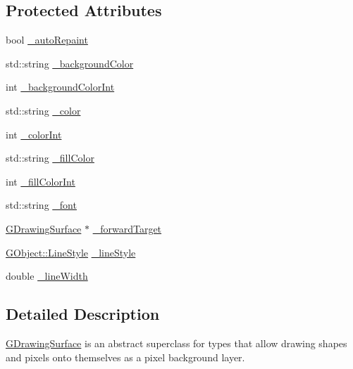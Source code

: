 \subsection*{Protected Attributes}
\begin{DoxyCompactItemize}
\item 
bool \mbox{\hyperlink{classsgl_1_1GDrawingSurface_a738dd6afc69ac536ad46cf4d89a90933}{\+\_\+auto\+Repaint}}
\item 
std\+::string \mbox{\hyperlink{classsgl_1_1GDrawingSurface_ad233544ea51cf6b435a199f3e3790607}{\+\_\+background\+Color}}
\item 
int \mbox{\hyperlink{classsgl_1_1GDrawingSurface_abb8452ab4f23ecf455b9e021bf09ef91}{\+\_\+background\+Color\+Int}}
\item 
std\+::string \mbox{\hyperlink{classsgl_1_1GDrawingSurface_a1134e770ae4315ea8bc1201e2f21da8b}{\+\_\+color}}
\item 
int \mbox{\hyperlink{classsgl_1_1GDrawingSurface_a003fdd343d9b7505c53a8b7a134200ed}{\+\_\+color\+Int}}
\item 
std\+::string \mbox{\hyperlink{classsgl_1_1GDrawingSurface_a179f8d6cee65cd8a54692e32b224392a}{\+\_\+fill\+Color}}
\item 
int \mbox{\hyperlink{classsgl_1_1GDrawingSurface_a751def333a67d651e5b99cc331ecb496}{\+\_\+fill\+Color\+Int}}
\item 
std\+::string \mbox{\hyperlink{classsgl_1_1GDrawingSurface_aea76ea1a8b5dd7b0a78653277e63b536}{\+\_\+font}}
\item 
\mbox{\hyperlink{classsgl_1_1GDrawingSurface}{G\+Drawing\+Surface}} $\ast$ \mbox{\hyperlink{classsgl_1_1GDrawingSurface_acbb02fa2a4a51a450fd1cc64dfc39ddd}{\+\_\+forward\+Target}}
\item 
\mbox{\hyperlink{classsgl_1_1GObject_a86e0f5648542856159bb40775c854aa7}{G\+Object\+::\+Line\+Style}} \mbox{\hyperlink{classsgl_1_1GDrawingSurface_ae15d02c66691247a6824dc5943a620e2}{\+\_\+line\+Style}}
\item 
double \mbox{\hyperlink{classsgl_1_1GDrawingSurface_a16e9033665937f13de2e163dc2184aff}{\+\_\+line\+Width}}
\end{DoxyCompactItemize}


\subsection{Detailed Description}
\mbox{\hyperlink{classsgl_1_1GDrawingSurface}{G\+Drawing\+Surface}} is an abstract superclass for types that allow drawing shapes and pixels onto themselves as a pixel background layer. 


